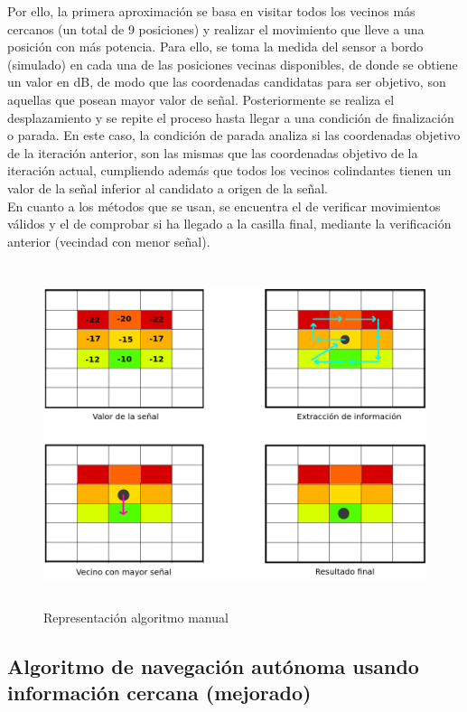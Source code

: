 Por ello, la primera aproximación se basa en visitar todos los vecinos más cercanos (un total de 9 posiciones) y realizar el movimiento que lleve a una posición con más potencia. Para ello, se toma la medida del sensor a bordo (simulado) en cada una de las posiciones vecinas disponibles, de donde se obtiene un valor en dB, de modo que las coordenadas candidatas para ser objetivo, son aquellas que posean mayor valor de señal. Posteriormente se realiza el desplazamiento y se repite el proceso hasta llegar a una condición de finalización o parada. En este caso, la condición de parada analiza si las coordenadas objetivo de la iteración anterior, son las mismas que las coordenadas objetivo de la iteración actual, cumpliendo además que todos los vecinos colindantes tienen un valor de la señal inferior al candidato a origen de la señal.\\

En cuanto a los métodos que se usan, se encuentra el de verificar movimientos válidos y el de comprobar si ha llegado a la casilla final, mediante la verificación anterior (vecindad con menor señal).\\

\begin{figure} [t]
    \begin{center}
    \includegraphics[height=10cm]{imagenes/cap4/9_algoritmo_manual.png}
    \end{center}
    \caption[Representación algoritmo manual]{Representación algoritmo manual}
    \label{fig:manual_algorithm}
\end{figure}

\subsection{Algoritmo de navegación autónoma usando información cercana (mejorado)}
\label{subsec:alg-manual-opt}

